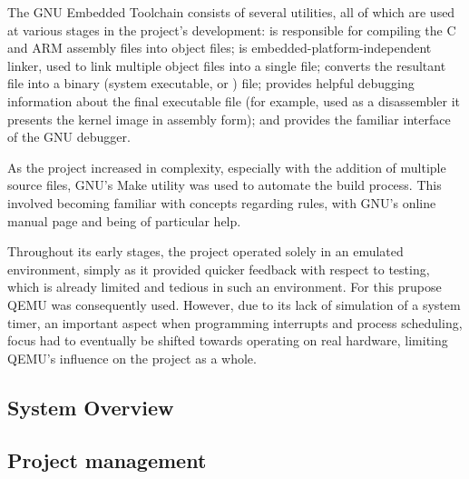         The GNU Embedded Toolchain consists of several utilities, all of which
        are used at various stages in the project's development:
         is responsible for compiling the C and ARM
        assembly files into object files;  is
        embedded-platform-independent linker, used to link multiple object files
        into a single  file;  converts
        the resultant  file into a binary (system executable, or
        ) file;  provides helpful
        debugging information about the final executable file (for example, used
        as a disassembler it presents the kernel image in assembly form); and
         provides the familiar interface of the GNU
        debugger.

        As the project increased in complexity, especially with the addition of
        multiple source files, GNU's Make utility was used to automate the build
        process. This involved becoming familiar with concepts regarding rules,
        with GNU's online manual page \cite{MakeManual} and \cite{MakeVariables}
        being of particular help.

        Throughout its early stages, the project operated solely in an emulated
        environment, simply as it provided quicker feedback with respect to
        testing, which is already limited and tedious in such an environment.
        For this prupose QEMU was consequently used. However, due to its lack of
        simulation of a system timer, an important aspect when programming
        interrupts and process scheduling, focus had to eventually be shifted
        towards operating on real hardware, limiting QEMU's influence on the
        project as a whole.
 
\subsection{System Overview}

\subsection{Project management}
